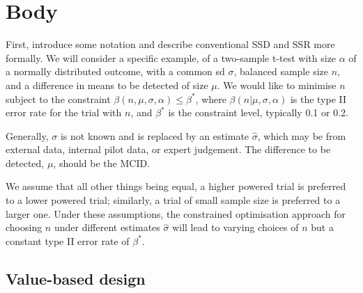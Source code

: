 \documentclass[sagev]{sagej}
\begin{document}
\section{Body}

First, introduce some notation and describe conventional SSD and SSR more formally. We will consider a specific example, of a two-sample t-test with size $\alpha$ of a normally distributed outcome, with a common sd $\sigma$, balanced sample size $n$, and a difference in means to be detected of size $\mu$. We would like to minimise $n$ subject to the constraint $\beta(n, \mu, \sigma, \alpha) \leq \beta^*$, where $\beta(n | \mu, \sigma, \alpha)$ is the type II error rate for the trial with $n$, and $\beta^*$ is the constraint level, typically 0.1 or 0.2.

Generally, $\sigma$ is not known and is replaced by an estimate $\hat{\sigma}$, which may be from external data, internal pilot data, or expert judgement. The difference to be detected, $\mu$, should be the MCID.

We assume that all other things being equal, a higher powered trial is preferred to a lower powered trial; similarly, a trial of small sample size is preferred to a larger one. Under these assumptions, the constrained optimisation approach for choosing $n$ under different estimates $\hat{\sigma}$ will lead to varying choices of $n$ but a constant type II error rate of $\beta^*$. 

\subsection{Value-based design}
\end{document}
